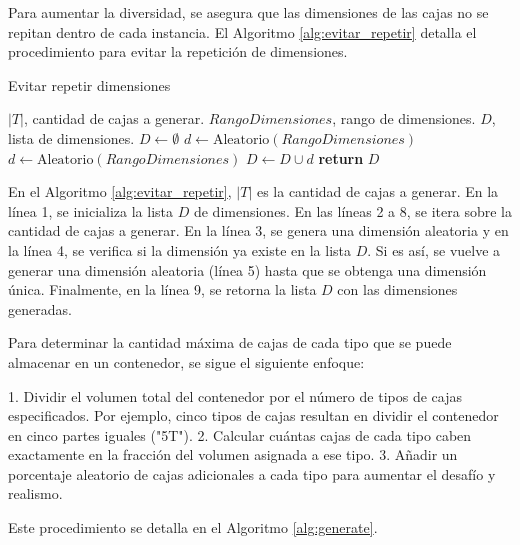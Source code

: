 Para aumentar la diversidad, se asegura que las dimensiones de las cajas no se repitan dentro de cada instancia. El Algoritmo \ref{alg:evitar_repetir} detalla el procedimiento para evitar la repetición de dimensiones.

\begin{algorithm}[H]
    \caption{Evitar repetir dimensiones}
    \label{alg:evitar_repetir}
    \begin{algorithmic}[1]
        \Require $|T|$, cantidad de cajas a generar.
        \Require $RangoDimensiones$, rango de dimensiones.
        \Ensure $D$, lista de dimensiones.
        \State $D \gets \emptyset$
        \State $d \gets \text{Aleatorio}(RangoDimensiones)$
        \State $d \gets \text{Aleatorio}(RangoDimensiones)$
        \EndWhile
        \State $D \gets D \cup d$
        \EndFor
        \State \textbf{return} $D$
    \end{algorithmic}
\end{algorithm}

En el Algoritmo \ref{alg:evitar_repetir}, $|T|$ es la cantidad de cajas a generar. En la línea 1, se inicializa la lista $D$ de dimensiones. En las líneas 2 a 8, se itera sobre la cantidad de cajas a generar. En la línea 3, se genera una dimensión aleatoria y en la línea 4, se verifica si la dimensión ya existe en la lista $D$. Si es así, se vuelve a generar una dimensión aleatoria (línea 5) hasta que se obtenga una dimensión única. Finalmente, en la línea 9, se retorna la lista $D$ con las dimensiones generadas.

Para determinar la cantidad máxima de cajas de cada tipo que se puede almacenar en un contenedor, se sigue el siguiente enfoque:

1. Dividir el volumen total del contenedor por el número de tipos de cajas especificados. Por ejemplo, cinco tipos de cajas resultan en dividir el contenedor en cinco partes iguales ("5T").
2. Calcular cuántas cajas de cada tipo caben exactamente en la fracción del volumen asignada a ese tipo.
3. Añadir un porcentaje aleatorio de cajas adicionales a cada tipo para aumentar el desafío y realismo.

Este procedimiento se detalla en el Algoritmo \ref{alg:generate}.

